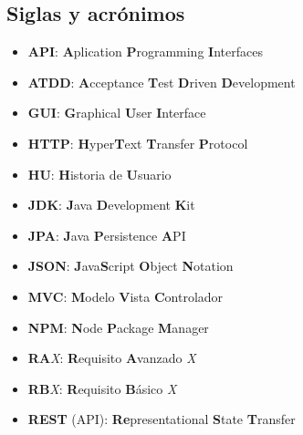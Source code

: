 \documentclass[../ei103948-project-documentation.tex]{subfiles}
\begin{document}
\subsection{Siglas y acrónimos}
    \begin{itemize}
        \item \textbf{API}: \textbf{A}plication \textbf{P}rogramming \textbf{I}nterfaces
        \item \textbf{ATDD}: \textbf{A}cceptance \textbf{T}est \textbf{D}riven \textbf{D}evelopment
        \item \textbf{GUI}: \textbf{G}raphical \textbf{U}ser \textbf{I}nterface
        \item \textbf{HTTP}: \textbf{H}yper\textbf{T}ext \textbf{T}ransfer \textbf{P}rotocol
        \item \textbf{HU}: \textbf{H}istoria de \textbf{U}suario
        \item \textbf{JDK}: \textbf{J}ava \textbf{D}evelopment \textbf{K}it
        \item \textbf{JPA}: \textbf{J}ava \textbf{P}ersistence \textbf{A}PI
        \item \textbf{JSON}: \textbf{J}ava\textbf{S}cript \textbf{O}bject \textbf{N}otation
        \item \textbf{MVC}: \textbf{M}odelo \textbf{V}ista \textbf{C}ontrolador
        \item \textbf{NPM}: \textbf{N}ode \textbf{P}ackage \textbf{M}anager
        \item \textbf{RA}\textit{X}: \textbf{R}equisito \textbf{A}vanzado \textit{X}
        \item \textbf{RB}\textit{X}: \textbf{R}equisito \textbf{B}ásico \textit{X}
        \item \textbf{REST} (API): \textbf{Re}presentational \textbf{S}tate \textbf{T}ransfer 
    \end{itemize}
\end{document}
